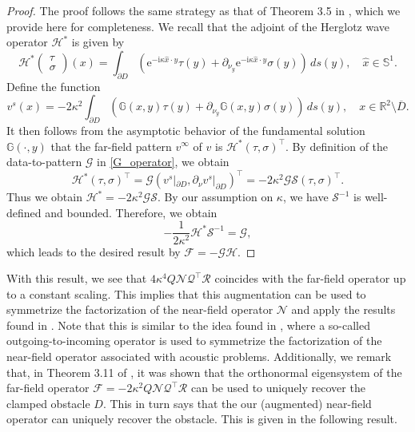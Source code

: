\documentclass{article}
\begin{document}
\begin{proof}
The proof follows the same strategy as that of Theorem 3.5 in
\cite{Zhu2026}, which we provide here for completeness. We recall that the adjoint of the Herglotz wave operator $\mathcal H^{*}$ is given by 
    \[
    \mathcal H^{*}\begin{pmatrix}
        \tau\\
        \sigma
    \end{pmatrix}(x)=\int_{\partial D}\left(\mathrm e^{-\mathrm i\kappa \hat x\cdot y}   \tau(y)+\partial_{\nu_y} \mathrm e^{-\mathrm i\kappa \hat x\cdot y}\sigma(y) \right)\,ds(y),\quad \hat x\in \mathbb S^1.
    \]
    Define the function 
    \[
    v^s(x)=-2\kappa^2\int_{\partial D}\left(\mathbb G(x,y)\tau(y)+\partial_{\nu_y}\mathbb G(x,y)\sigma(y)\right)\,ds(y),\quad x\in \mathbb R^2\setminus\overline D.
    \]
    It then follows from the asymptotic behavior of the fundamental solution $\mathbb G(\cdot,y)$ that the far-field pattern $v^{\infty}$ of $v$ is $\mathcal H^{*}(\tau,\sigma)^\top$. By definition of the data-to-pattern $\mathcal G$ in \eqref{G_operator}, we obtain
    \[
    \mathcal H^{*}(\tau,\sigma)^\top =\mathcal G(v^s|_{\partial D},\partial_\nu v^s|_{\partial D})^\top =-2\kappa^2 \mathcal G\mathcal S(\tau,\sigma)^\top.
    \]
    Thus we obtain $\mathcal H^{*}=-2\kappa^2\mathcal G\mathcal S$. By our assumption on $\kappa$, we have $\mathcal S^{-1}$ is well-defined and bounded. Therefore, we obtain
    \[
   - \frac{1}{2\kappa^2}\mathcal H^{*}\mathcal{S}^{-1}=\mathcal G,
    \]
    which leads to the desired result by $\mathcal F=-\mathcal G\mathcal H$.
\end{proof}


With this result, we see that $4\kappa^4Q\mathcal N\mathcal Q^\top \mathcal R$ coincides with the far-field operator up to a constant scaling. This implies that this augmentation can be used to symmetrize the factorization of the near-field operator $\mathcal N$ and apply the results found in \cite{Zhu2026}. Note that this is similar to the idea found in \cite{Hu-nfFM}, where a so-called outgoing-to-incoming operator is used to symmetrize the factorization of the near-field operator associated with acoustic problems. Additionally, we remark that, in Theorem 3.11 of \cite{Zhu2026}, it was shown
that the orthonormal eigensystem of the far-field operator $\mathcal F=-2\kappa^2 Q\mathcal N\mathcal Q^\top \mathcal R$ can be used to uniquely recover the clamped obstacle $D$. This in turn says that the our (augmented) near-field operator can uniquely recover the obstacle. This is given in the following result. 
\end{document}
